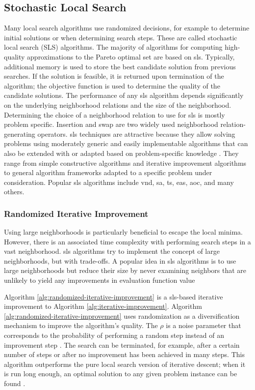 \subsection{Stochastic Local Search}
Many local search algorithms use randomized decisions, for example to determine initial solutions or when determining search steps. These are called stochastic local search (SLS) algorithms. The majority of algorithms for computing high-quality approximations to the Pareto optimal set are based on \gls{sls}. Typically, additional memory is used to store the best candidate solution from previous searches. If the solution is feasible, it is returned upon termination of the algorithm; the objective function is used to determine the quality of the candidate solutions. The performance of any \gls{sls} algorithm depends significantly on the underlying neighborhood relations and the size of the neighborhood. Determining the choice of a neighborhood relation to use for \gls{sls} is mostly problem specific. Insertion and swap are two widely used neighborhood relation-generating operators. \gls{sls} techniques are attractive because they allow solving problems using moderately generic and easily implementable algorithms that can also be extended with or adapted based on problem-specific knowledge \parencite{HolgerH2005StochasticSearch}. They range from simple constructive algorithms and iterative improvement algorithms to general algorithm frameworks adapted to a specific problem under consideration. Popular \gls{sls} algorithms include \gls{vnd}, \gls{sa}, \gls{ts}, \glspl{ea}, \gls{aoc}, and many others. 

\subsubsection{Randomized Iterative Improvement}
Using large neighborhoods is particularly beneficial to escape the local minima. However, there is an associated time complexity with performing search steps in a vast neighborhood. \gls{sls} algorithms try to implement the concept of large neighborhoods, but with trade-offs. A popular idea in \gls{sls} algorithms is to use large neighborhoods but reduce their size by never examining neighbors that are unlikely to yield any improvements in evaluation function value

Algorithm \ref{alg:randomized-iterative-improvement} is a \gls{sls}-based iterative improvement to Algorithm \ref{alg:iterative-improvement}. Algorithm \ref{alg:randomized-iterative-improvement} uses randomization as a diversification mechanism to improve the algorithm’s quality. The $\rho$ is a noise parameter that corresponds to the probability of performing a random step instead of an improvement step \parencite{HolgerH2005StochasticSearch}. The search can be terminated, for example, after a certain number of steps or after no improvement has been achieved in many steps. This algorithm outperforms the pure local search version of iterative descent; when it is run long enough, an optimal solution to any given problem instance can be found \parencite{HolgerH2005StochasticSearch}.

